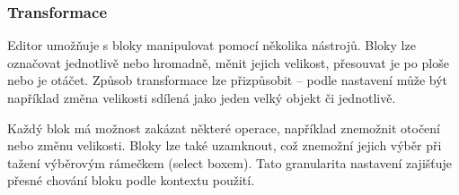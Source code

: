 \subsubsection{Transformace}

Editor umožňuje s bloky manipulovat pomocí několika nástrojů. 
Bloky lze označovat jednotlivě nebo hromadně, měnit jejich velikost, přesouvat je po ploše nebo je otáčet. 
Způsob transformace lze přizpůsobit -- podle nastavení může být například změna velikosti sdílená jako jeden velký objekt či jednotlivě.

Každý blok má možnost zakázat některé operace, například znemožnit otočení nebo změnu velikosti. 
Bloky lze také uzamknout, což znemožní jejich výběr při tažení výběrovým rámečkem (select boxem). 
Tato granularita nastavení zajišťuje přesné chování bloku podle kontextu použití.









